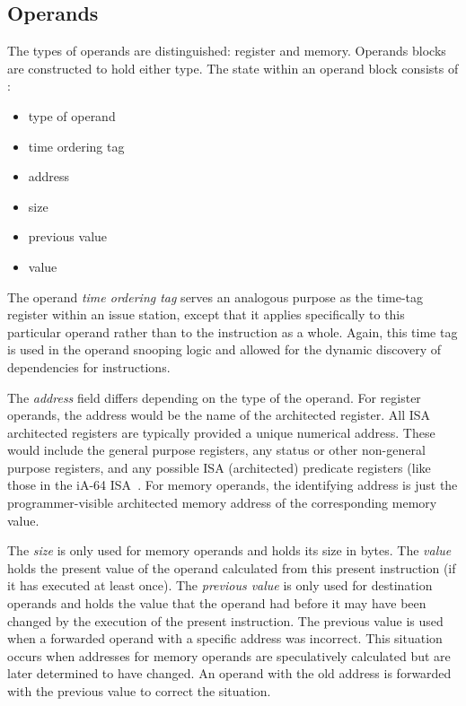 \documentclass[10pt,twocolumn,dvips]{article}
\begin{document}
\subsection{Operands}
%
The types of operands are distinguished: register and memory.
Operands blocks are constructed to hold either type.
The state within an operand block consists of :
%
\begin{itemize}
\vspace{-0.10in}
\item{type of operand}
\vspace{-0.10in}
\item{time ordering tag}
\vspace{-0.10in}
\item{address}
\vspace{-0.10in}
\item{size}
\vspace{-0.10in}
\item{previous value}
\vspace{-0.10in}
\item{value}
\vspace{-0.10in}
\end{itemize}   
%
The operand \textit{time ordering tag}
serves
an analogous purpose as the time-tag register within an issue station,
except that it applies specifically to this particular
operand rather than to the instruction as a whole.
Again, this time tag is used in the operand snooping logic
and allowed for the dynamic discovery of dependencies
for instructions.

The \textit{address} field differs
depending on the type of the operand.
For register operands, the address would be
the name of the architected register.
All ISA architected registers are typically provided a
unique numerical address.  These would include the
general purpose registers, any status or other non-general
purpose registers, and any possible ISA (architected) predicate registers
(like those in the iA-64 ISA~\cite{intel99ia,schlansker00epic}.
For memory operands, the identifying address is just the
programmer-visible architected memory address of the corresponding
memory value.

The \textit{size} is only used for memory operands and holds
its size in bytes.
The \textit{value} holds the present value of the operand
calculated from this present instruction (if it has executed
at least once).
The \textit{previous value} is only used for destination
operands and holds the value that the operand
had before it may have been changed by the execution of 
the present instruction.
The previous value is used 
when a forwarded operand with a specific
address was incorrect.
This situation occurs when addresses for memory operands are
speculatively calculated but are later determined to have changed.
An operand with the old address is forwarded with the previous
value to correct the situation.
\end{document}
